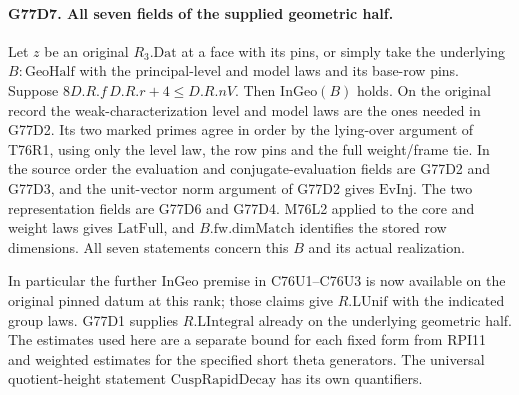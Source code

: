 \paragraph{G77D7. All seven fields of the supplied geometric half.}
Let $z$ be an original $R_3.\mathrm{Dat}$ at a face with its
pins, or simply take the underlying $B:\mathrm{GeoHalf}$ with
the principal-level and model laws and its base-row pins.
Suppose $8D.R.f\,D.R.r+4\le D.R.nV$.
Then $\mathrm{InGeo}(B)$ holds. On the original record the
weak-characterization level and model laws are the ones needed
in G77D2. Its two marked primes agree in order by the lying-over
argument of T76R1, using only the level law, the row pins and
the full weight/frame tie. In the source order the evaluation
and conjugate-evaluation fields are G77D2 and G77D3, and the
unit-vector norm argument of G77D2 gives $\mathrm{EvInj}$.
The two representation fields are G77D6 and G77D4. M76L2
applied to the core and weight laws gives $\mathrm{LatFull}$,
and $B.\mathrm{fw.dimMatch}$ identifies the stored row dimensions.
All seven statements concern this $B$ and its actual realization.

In particular the further $\mathrm{InGeo}$ premise in C76U1--C76U3
is now available on the original pinned datum at this rank; those
claims give $R.\mathrm{LUnif}$ with the indicated group laws.
G77D1 supplies $R.\mathrm{LIntegral}$ already on the underlying
geometric half. The estimates used here are a separate bound for
each fixed form from RPI11 and weighted estimates for the specified
short theta generators. The universal quotient-height statement
$\mathrm{CuspRapidDecay}$ has its own quantifiers.
